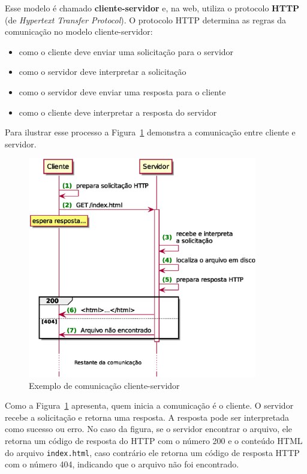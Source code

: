 \documentclass[brazil,a4paper,oneside,openright,parskip=full]{book}
\newcommand{\passthrough}[1]{#1}
\providecommand{\tightlist}{%
  \setlength{\itemsep}{0pt}\setlength{\parskip}{0pt}}
\begin{document}
Esse modelo é chamado \textbf{cliente-servidor} e, na web, utiliza o
protocolo \textbf{HTTP} (de \emph{Hypertext Transfer Protocol}). O
protocolo HTTP determina as regras da comunicação no modelo
cliente-servidor:

\begin{itemize}
\tightlist
\item
  como o cliente deve enviar uma solicitação para o servidor
\item
  como o servidor deve interpretar a solicitação
\item
  como o servidor deve enviar uma resposta para o cliente
\item
  como o cliente deve interpretar a resposta do servidor
\end{itemize}

Para ilustrar esse processo a Figura~\ref{fig:com-cliente-servidor}
demonstra a comunicação entre cliente e servidor.

\begin{figure}
\hypertarget{fig:com-cliente-servidor}{%
\centering
\includegraphics[width=10cm,height=\textheight]{db50a4295b9805759468deef4bdfb3010078ccac.eps}
\caption{Exemplo de comunicação
cliente-servidor\label{fig:com-cliente-servidor}}\label{fig:com-cliente-servidor}
}
\end{figure}

Como a Figura~\ref{fig:com-cliente-servidor} apresenta, quem inicia a
comunicação é o cliente. O servidor recebe a solicitação e retorna uma
resposta. A resposta pode ser interpretada como sucesso ou erro. No caso
da figura, se o servidor encontrar o arquivo, ele retorna um código de
resposta do HTTP com o número 200 e o conteúdo HTML do arquivo
\passthrough{\lstinline!index.html!}, caso contrário ele retorna um
código de resposta HTTP com o número 404, indicando que o arquivo não
foi encontrado.
\end{document}

